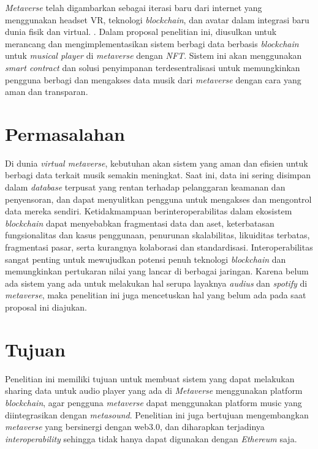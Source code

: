 \emph{Metaverse} telah digambarkan sebagai iterasi baru dari internet yang menggunakan headset VR, teknologi \emph{blockchain},
dan avatar dalam integrasi baru dunia fisik dan virtual. \parencite{DWIVEDI2022102542}. Dalam proposal penelitian ini, diusulkan
untuk merancang dan mengimplementasikan sistem berbagi data berbasis \emph{blockchain}
untuk \emph{musical player} di \emph{metaverse} dengan \emph{NFT}. Sistem ini akan menggunakan \emph{smart contract} dan solusi penyimpanan terdesentralisasi
untuk memungkinkan pengguna berbagi dan mengakses data musik dari \emph{metaverse} dengan cara yang aman dan transparan.

\section{Permasalahan}
\label{sec:permasalahan}

Di dunia \emph{virtual metaverse}, kebutuhan akan sistem yang aman dan efisien untuk berbagi data terkait musik semakin meningkat.
Saat ini, data ini sering disimpan dalam \emph{database} terpusat yang rentan terhadap pelanggaran keamanan dan
penyensoran, dan dapat menyulitkan pengguna untuk mengakses dan mengontrol data mereka sendiri. Ketidakmampuan berinteroperabilitas 
dalam ekosistem \emph{blockchain} dapat menyebabkan fragmentasi data dan aset, keterbatasan fungsionalitas dan kasus penggunaan, penurunan skalabilitas, 
likuiditas terbatas, fragmentasi pasar, serta kurangnya kolaborasi dan standardisasi. Interoperabilitas sangat penting untuk mewujudkan potensi penuh teknologi 
\emph{blockchain} dan memungkinkan pertukaran nilai yang lancar di berbagai jaringan. Karena belum ada sistem yang ada untuk melakukan
hal serupa layaknya \emph{audius} dan \emph{spotify} di \emph{metaverse},
maka penelitian ini juga mencetuskan hal yang belum ada pada saat proposal ini diajukan.

\section{Tujuan}
\label{sec:Tujuan}

Penelitian ini memiliki tujuan untuk membuat sistem yang
dapat melakukan sharing data untuk audio player yang ada
di \emph{Metaverse} menggunakan platform \emph{blockchain}, agar
pengguna \emph{metaverse} dapat menggunakan platform music
yang diintegrasikan dengan \emph{metasound}. Penelitian ini juga bertujuan mengembangkan \emph{metaverse} yang
bersinergi dengan web3.0, dan diharapkan terjadinya \emph{interoperability} sehingga tidak hanya dapat digunakan
dengan \emph{Ethereum} saja.

